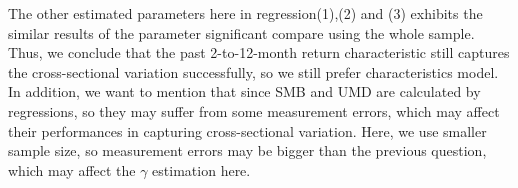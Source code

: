 \documentclass{report}
\begin{document}
The other estimated parameters here in regression(1),(2) and (3) exhibits the similar results of the parameter significant compare using the whole sample. Thus, we conclude that the past 2-to-12-month return characteristic still captures the cross-sectional variation successfully, so we still prefer characteristics model. In addition, we want to mention that since SMB and UMD are calculated by regressions, so they may suffer from some measurement errors, which may affect their performances in capturing cross-sectional variation. Here, we use smaller sample size, so measurement errors may be bigger than the previous question, which may affect the $\gamma$ estimation here. 
\end{document}
